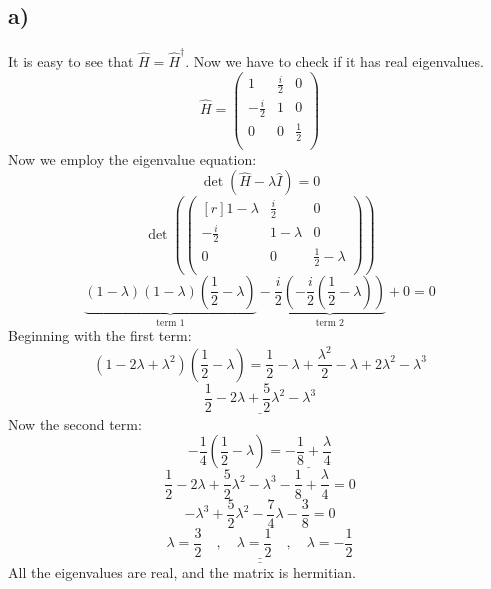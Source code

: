 \documentclass{article}
\begin{document}
\subsection*{a)}
It is easy to see that $\hat{H} = \hat{H}^{†}$. Now we have to check if it has real eigenvalues. 
\[
\hat{H} = 
\begin{pmatrix}
 1 & \frac{i}{2} & 0 \\
 -\frac{i}{2} & 1 & 0 \\
 0 & 0 & \frac{1}{2} \\
\end{pmatrix}
\]
Now we employ the eigenvalue equation:
\[
\det \left(\hat{H} - \lambda \hat{I}\right) = 0
\]
\[
\det \left(
\begin{pmatrix*}[r]
 1-λ & \frac{i}{2} &0 \\
 -\frac{i}{2} & 1 - λ & 0 \\
 0 & 0 & \frac{1}{2} - λ \\
\end{pmatrix*}
\right)
\]
\[
\underbrace{(1-λ) (1 - λ)\left(\frac{1}{2} - λ\right)}_{\text{term 1}} -\underbrace{ \frac{i}{2} \left( - \frac{i}{2} \left(\frac{1}{2} - λ\right)\right)}_{\text{term 2}} + 0 = 0
\]
Beginning with the first term:
\[
(1 - 2λ + λ^2)\left(\frac{1}{2} - λ\right) = \frac{1}{2} - λ + \frac{λ^2}{2} - λ + 2λ^2 - λ^3 
\]
\[
\underline{\frac{1}{2} - 2λ + \frac{5}{2}λ^2 - λ^3}
\]
Now the second term:
\[
- \frac{1}{4} \left(\frac{1}{2} - λ\right) = \underline{- \frac{1}{8} + \frac{λ}{4}}
\]
\[
\frac{1}{2} - 2λ + \frac{5}{2}λ^2 - λ^3 - \frac{1}{8} + \frac{λ}{4} = 0
\]
\[
-λ^3 + \frac{5}{2}λ^2 - \frac{7}{4}λ - \frac{3}{8} = 0
\]
\[
\underline{\underline{λ = \frac{3}{2} \quad , \quad λ   = \frac{1}{2} \quad , \quad λ = -\frac{1}{2}}}
\]
All the eigenvalues are real, and the matrix is hermitian.
\end{document}
